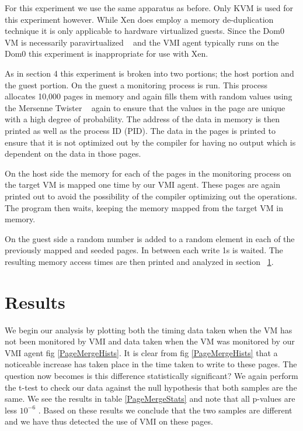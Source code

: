 For this experiment we use the same apparatus as before. Only KVM is used for this experiment however. While Xen does employ a memory de-duplication technique it is only applicable to hardware virtualized guests. Since the Dom0 VM is necessarily paravirtualized ~\cite{barham_xen_2003} and the VMI agent typically runs on the Dom0 this experiment is inappropriate for use with Xen. 

As in section 4 this experiment is broken into two portions; the host portion and the guest portion. On the guest a monitoring process is run. This process allocates 10,000 pages in memory and again fills them with random values using the Mersenne Twister ~\cite{matsumoto_mersenne_1998} again to ensure that the values in the page are unique with a high degree of probability. The address of the data in memory is then printed as well as the process ID (PID). The data in the pages is printed to ensure that it is not optimized out by the compiler for having no output which is dependent on the data in those pages.

On the host side the memory for each of the pages in the monitoring process on the target VM is mapped one time by our VMI agent. These pages are again printed out to avoid the possibility of the compiler optimizing out the operations. The program then waits, keeping the memory mapped from the target VM in memory. 

On the guest side a random number is added to a random element in each of the previously mapped and seeded pages. In between each write 1s is waited. The resulting memory access times are then printed and analyzed in section ~\ref{PageMergeChap-Res}.

\section{Results}\label{PageMergeChap-Res}
We begin our analysis by plotting both the timing data taken when the VM has not been monitored by VMI and data taken when the VM was monitored by our VMI agent fig \ref{PageMergeHists}. It is clear from fig \ref{PageMergeHists} that a noticeable increase has taken place in the time taken to write to these pages. The question now becomes is this difference statistically significant? We again perform the t-test to check our data against the null hypothesis that both samples are the same. We see the results in table \ref{PageMergeStats} and note that all p-values are less  $10^{-6}$ . Based on these results we conclude that the two samples are different and we have thus detected the use of VMI on these pages.

